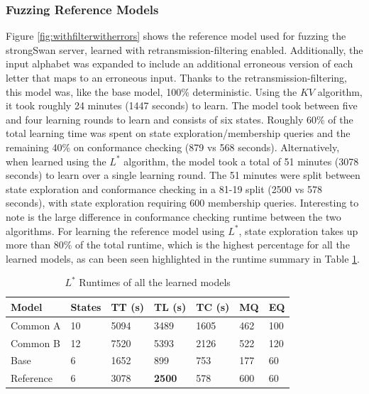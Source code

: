 \subsubsection*{Fuzzing Reference Models}
Figure \ref{fig:withfilterwitherrors} shows the reference model used for fuzzing the strongSwan server, learned with retransmission-filtering enabled. Additionally, the input alphabet was expanded to include an additional erroneous version of each letter that maps to an erroneous input. Thanks to the retransmission-filtering, this model was, like the base model, 100\% deterministic. Using the $KV$ algorithm, it took roughly 24 minutes (1447 seconds) to learn. The model took between five and four learning rounds to learn and consists of six states. Roughly 60\% of the total learning time was spent on state exploration/membership queries and the remaining 40\% on conformance checking (879 vs 568 seconds). Alternatively, when learned using the $L^*$ algorithm, the model took a total of 51 minutes (3078 seconds) to learn over a single learning round. The 51 minutes were split between state exploration and conformance checking in a 81-19 split (2500 vs 578 seconds), with state exploration requiring 600 membership queries. Interesting to note is the large difference in conformance checking runtime between the two algorithms. For learning the reference model using $L^*$, state exploration takes up more than 80\% of the total runtime, which is the highest percentage for all the learned models, as can been seen highlighted in the runtime summary in Table \ref{tab:runtime_summary_lstar}.

\begin{table}[h]
	\centering
	\begin{tabular}{|l|l|l|l|l|l|l|}
		\hline
		\rowcolor[HTML]{C0C0C0} 
		Model     & States & TT (s)   & TL (s)   & TC (s)   & MQ  & EQ  \\ \hline
		Common A  & 10     & 5094 & 3489 & 1605 & 462 & 100 \\ \hline
		Common B  & 12     & 7520 & 5393 & 2126 & 522 & 120 \\ \hline
		Base      & 6      & 1652 & 899  & 753  & 177 & 60  \\ \hline
		Reference & 6      & 3078 & \textbf{2500} & 578  & 600 & 60  \\ \hline
	\end{tabular}
	\caption{$L^*$ Runtimes of all the learned models}
	\label{tab:runtime_summary_lstar}
\end{table}

